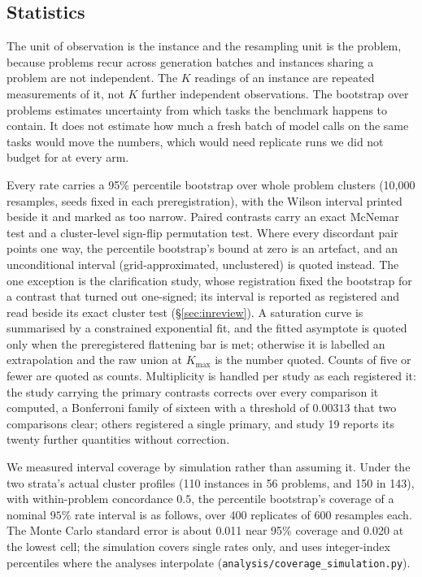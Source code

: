 \subsection{Statistics}
\label{sec:stats}

The unit of observation is the instance and the resampling unit is the problem, because problems
recur across generation batches and instances sharing a problem are not independent. The $K$
readings of an instance are repeated measurements of it, not $K$ further independent
observations. The bootstrap over problems estimates uncertainty from which tasks the benchmark
happens to contain. It does not estimate how much a fresh batch of model calls on the same tasks
would move the numbers, which would need replicate runs we did not budget for at every arm.

Every rate carries a 95\% percentile bootstrap over whole problem clusters (10{,}000 resamples,
seeds fixed in each preregistration), with the Wilson interval printed beside it and marked as too
narrow. Paired contrasts carry an exact McNemar test and a cluster-level sign-flip permutation
test. Where every discordant pair points one way, the percentile bootstrap's bound at zero is an
artefact, and an unconditional interval (grid-approximated, unclustered) is quoted instead. The
one exception is the clarification study, whose registration fixed the bootstrap for a contrast
that turned out one-signed; its interval is reported as registered and read beside its exact
cluster test (\S\ref{sec:inreview}). A saturation curve is summarised by a constrained
exponential fit, and the fitted asymptote is quoted only when the preregistered flattening bar is
met; otherwise it is labelled an extrapolation and the raw union at $K_{\max}$ is the number
quoted. Counts of five or fewer are quoted as counts. Multiplicity is handled per study as each
registered it: the study carrying the primary contrasts corrects over every comparison it
computed, a Bonferroni family of sixteen with a threshold of $0.00313$ that two comparisons clear;
others registered a single primary, and study 19 reports its twenty further quantities without
correction.

We measured interval coverage by simulation rather than assuming it. Under the two strata's
actual cluster profiles (110 instances in 56 problems, and 150 in 143), with within-problem
concordance $0.5$, the percentile bootstrap's coverage of a nominal $95\%$ rate interval is as
follows, over 400 replicates of 600 resamples each. The Monte Carlo standard error is about 0.011
near 95\% coverage and 0.020 at the lowest cell; the simulation covers single rates only, and uses
integer-index percentiles where the analyses interpolate (\texttt{analysis/coverage\_simulation.py}).

